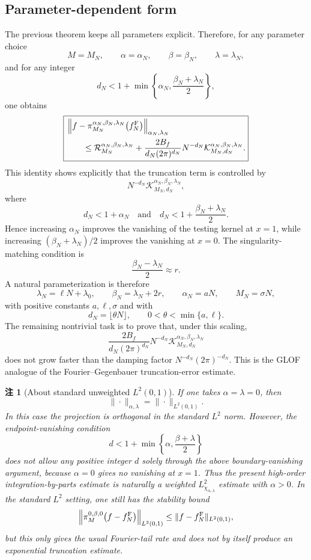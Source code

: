 \documentclass[UTF8]{ctexart}
\newtheorem{remark}{注}
\begin{document}
\subsection{Parameter-dependent form}

The previous theorem keeps all parameters explicit. Therefore, for any parameter choice
\[
    M=M_N,
    \qquad
    \alpha=\alpha_N,
    \qquad
    \beta=\beta_N,
    \qquad
    \lambda=\lambda_N,
\]
and for any integer
\[
    d_N<1+\min\left\{
    \alpha_N,\frac{\beta_N+\lambda_N}{2}
    \right\},
\]
one obtains
\[
\boxed{
\begin{aligned}
    &
    \left\|
    f-\pi_{M_N}^{\alpha_N,\beta_N,\lambda_N}
    \bigl(f_N^{\rm F}\bigr)
    \right\|_{\alpha_N,\lambda_N}
    \\
    &\qquad
    \le
    \mathcal R_{M_N}^{\alpha_N,\beta_N,\lambda_N}
    +
    \frac{
    2B_f
    }{
    d_N(2\pi)^{d_N}
    }
    N^{-d_N}
    \mathcal K_{M_N,d_N}^{\alpha_N,\beta_N,\lambda_N}.
\end{aligned}
}
\]
This identity shows explicitly that the truncation term is controlled by
\[
    N^{-d_N}
    \mathcal K_{M_N,d_N}^{\alpha_N,\beta_N,\lambda_N},
\]
where
\[
    d_N<1+\alpha_N
    \quad\text{and}\quad
    d_N<
    1+\frac{\beta_N+\lambda_N}{2}.
\]
Hence increasing $\alpha_N$ improves the vanishing of the testing kernel at
$x=1$, while increasing $(\beta_N+\lambda_N)/2$ improves the vanishing at
$x=0$. The singularity-matching condition is
\[
    \frac{\beta_N-\lambda_N}{2}\approx r.
\]
A natural parameterization is therefore
\[
    \lambda_N=\ell N+\lambda_0,
    \qquad
    \beta_N=\lambda_N+2r,
    \qquad
    \alpha_N=aN,
    \qquad
    M_N=\sigma N,
\]
with positive constants $a,\ell,\sigma$ and with
\[
    d_N=\lfloor \theta N\rfloor,
    \qquad
    0<\theta<\min\{a,\ell\}.
\]
The remaining nontrivial task is to prove that, under this scaling,
\[
    \frac{
    2B_f
    }{
    d_N(2\pi)^{d_N}
    }
    N^{-d_N}
    \mathcal K_{M_N,d_N}^{\alpha_N,\beta_N,\lambda_N}
\]
does not grow faster than the damping factor
$N^{-d_N}(2\pi)^{-d_N}$. This is the GLOF analogue of the
Fourier--Gegenbauer truncation-error estimate.

\begin{remark}[About standard unweighted $L^2(0,1)$]
If one takes $\alpha=\lambda=0$, then
\[
    \|\cdot\|_{\alpha,\lambda}=\|\cdot\|_{L^2(0,1)}.
\]
In this case the projection is orthogonal in the standard $L^2$ norm.
However, the endpoint-vanishing condition
\[
    d<1+\min\left\{\alpha,\frac{\beta+\lambda}{2}\right\}
\]
does not allow any positive integer $d$ solely through the above
boundary-vanishing argument, because $\alpha=0$ gives no vanishing at
$x=1$. Thus the present high-order integration-by-parts estimate is
naturally a weighted $L^2_{\chi_{\alpha,\lambda}}$ estimate with
$\alpha>0$. In the standard $L^2$ setting, one still has the stability
bound
\[
    \left\|
    \pi_M^{0,\beta,0}
    \bigl(f-f_N^{\rm F}\bigr)
    \right\|_{L^2(0,1)}
    \le
    \|f-f_N^{\rm F}\|_{L^2(0,1)},
\]
but this only gives the usual Fourier-tail rate and does not by itself
produce an exponential truncation estimate.
\end{remark}
\end{document}
